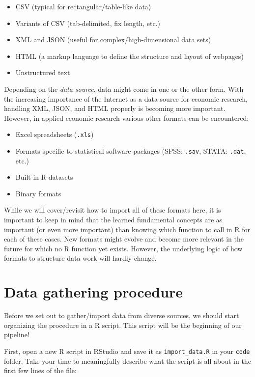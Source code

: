 \documentclass[
  12pt,
]{style/krantz}
\providecommand{\tightlist}{%
  \setlength{\itemsep}{0pt}\setlength{\parskip}{0pt}}
\begin{document}
\begin{itemize}
\tightlist
\item
  CSV (typical for rectangular/table-like data)
\item
  Variants of CSV (tab-delimited, fix length, etc.)
\item
  XML and JSON (useful for complex/high-dimensional data sets)
\item
  HTML (a markup language to define the structure and layout of webpages)
\item
  Unstructured text
\end{itemize}

Depending on the \emph{data source}, data might come in one or the other form. With the increasing importance of the Internet as a data source for economic research, handling XML, JSON, and HTML properly is becoming more important. However, in applied economic research various other formats can be encountered:

\begin{itemize}
\tightlist
\item
  Excel spreadsheets (\texttt{.xls})
\item
  Formats specific to statistical software packages (SPSS: \texttt{.sav}, STATA: \texttt{.dat}, etc.)
\item
  Built-in R datasets
\item
  Binary formats
\end{itemize}

While we will cover/revisit how to import all of these formats here, it is important to keep in mind that the learned fundamental concepts are as important (or even more important) than knowing which function to call in R for each of these cases. New formats might evolve and become more relevant in the future for which no R function yet exists. However, the underlying logic of how formats to structure data work will hardly change.

\hypertarget{data-gathering-procedure}{%
\section{Data gathering procedure}\label{data-gathering-procedure}}

Before we set out to gather/import data from diverse sources, we should start organizing the procedure in a R script. This script will be the beginning of our pipeline!

First, open a new R script in RStudio and save it as \texttt{import\_data.R} in your \texttt{code} folder. Take your time to meaningfully describe what the script is all about in the first few lines of the file:
\end{document}
